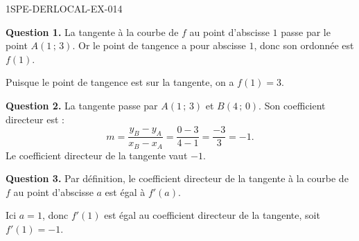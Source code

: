 \begin{corrige}{1SPE-DERLOCAL-EX-014}

\textbf{Question 1.} La tangente à la courbe de $f$ au point d'abscisse $1$ passe par le point $A(1\,;\,3)$. Or le point de tangence a pour abscisse $1$, donc son ordonnée est $f(1)$.

Puisque le point de tangence est sur la tangente, on a $\boxed{f(1) = 3}$.

\textbf{Question 2.} La tangente passe par $A(1\,;\,3)$ et $B(4\,;\,0)$. Son coefficient directeur est :
\[
m = \dfrac{y_B - y_A}{x_B - x_A} = \dfrac{0 - 3}{4 - 1} = \dfrac{-3}{3} = -1.
\]
Le coefficient directeur de la tangente vaut $\boxed{-1}$.

\textbf{Question 3.} Par définition, le coefficient directeur de la tangente à la courbe de $f$ au point d'abscisse $a$ est égal à $f'(a)$.

Ici $a = 1$, donc $f'(1)$ est égal au coefficient directeur de la tangente, soit $\boxed{f'(1) = -1}$.

\end{corrige}
